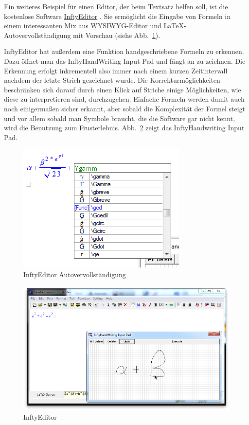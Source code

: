 Ein weiteres Beispiel für einen Editor, der beim Textsatz helfen soll, ist die kostenlose Software \href{http://www.inftyproject.org}{InftyEditor} \cite{Suzuki:2003p786}. Sie ermöglicht die Eingabe von Formeln in einem interessanten Mix aus \ac{WYSIWYG}-Editor und \LaTeX-Autovervollständigung mit Vorschau (siehe Abb.~\ref{fig:inftyeditor-autocomplete}). 

InftyEditor hat außerdem eine Funktion handgeschriebene Formeln zu erkennen. Dazu öffnet man das InftyHandWriting Input Pad und fängt an zu zeichnen. Die Erkennung erfolgt inkrementell also immer nach einem kurzen Zeitintervall nachdem der letzte Strich gezeichnet wurde. Die Korrekturmöglichkeiten beschränken sich darauf durch einen Klick auf Striche einige Möglichkeiten, wie diese zu interpretieren sind, durchzugehen. Einfache Formeln werden damit auch noch einigermaßen sicher erkannt, aber sobald die Komplexität der Formel steigt und vor allem sobald man Symbole braucht, die die Software gar nicht kennt, wird die Benutzung zum Frusterlebnis. Abb.~\ref{fig:inftyeditor} zeigt das InftyHandwriting Input Pad.

\begin{figure}[htbp]
  \begin{center}
    \includegraphics[width=.5\textwidth]{figures/inftyeditor-autocomplete.png}
  \end{center}
  \caption{InftyEditor Autovervollständigung}
  \label{fig:inftyeditor-autocomplete}
\end{figure}

\begin{figure}[htbp]
  \begin{center}
    \includegraphics[width=.8\textwidth]{figures/inftyeditor.png}
  \end{center}
  \caption{InftyEditor}
  \label{fig:inftyeditor}
\end{figure}

